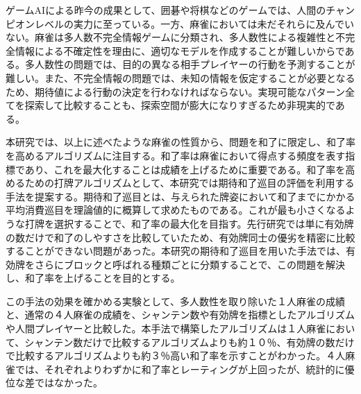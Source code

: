 
\begin{jabstract}

ゲームAIによる昨今の成果として、囲碁や将棋などのゲームでは、人間のチャンピオンレベルの実力に至っている。一方、麻雀においては未だそれらに及んでいない。麻雀は多人数不完全情報ゲームに分類され、多人数性による複雑性と不完全情報による不確定性を理由に、適切なモデルを作成することが難しいからである。多人数性の問題では、目的の異なる相手プレイヤーの行動を予測することが難しい。また、不完全情報の問題では、未知の情報を仮定することが必要となるため、期待値による行動の決定を行わなければならない。実現可能なパターン全てを探索して比較することも、探索空間が膨大になりすぎるため非現実的である。

本研究では、以上に述べたような麻雀の性質から、問題を和了に限定し、和了率を高めるアルゴリズムに注目する。和了率は麻雀において得点する頻度を表す指標であり、これを最大化することは成績を上げるために重要である。和了率を高めるための打牌アルゴリズムとして、本研究では期待和了巡目の評価を利用する手法を提案する。期待和了巡目とは、与えられた牌姿において和了までにかかる平均消費巡目を理論値的に概算して求めたものである。これが最も小さくなるような打牌を選択することで、和了率の最大化を目指す。先行研究では単に有効牌の数だけで和了のしやすさを比較していたため、有効牌同士の優劣を精密に比較することができない問題があった。本研究の期待和了巡目を用いた手法では、有効牌をさらにブロックと呼ばれる種類ごとに分類することで、この問題を解決し、和了率を上げることを目的とする。

この手法の効果を確かめる実験として、多人数性を取り除いた１人麻雀の成績と、通常の４人麻雀の成績を、シャンテン数や有効牌を指標としたアルゴリズムや人間プレイヤーと比較した。本手法で構築したアルゴリズムは１人麻雀において、シャンテン数だけで比較するアルゴリズムよりも約１０％、有効牌の数だけで比較するアルゴリズムよりも約３％高い和了率を示すことがわかった。４人麻雀では、それぞれよりわずかに和了率とレーティングが上回ったが、統計的に優位な差ではなかった。


\end{jabstract}


